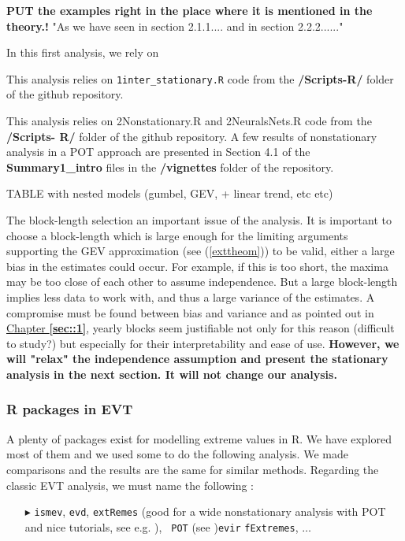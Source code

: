 \textbf{PUT the examples right in the place where it is mentioned in the theory.!} 
"As we have seen in section 2.1.1.... and in section 2.2.2......"

In this first analysis, we rely on 

This analysis relies on \texttt{1inter\_stationary.R} code from the \textbf{/Scripts-R/} folder of the github repository.

This analysis relies on 2Nonstationary.R and 2NeuralsNets.R code from the\textbf{ /Scripts-
R/} folder of the github repository. A few results of nonstationary analysis in a POT approach are
presented in Section 4.1 of the \textbf{Summary1\_intro} files in the \textbf{/vignettes} folder of the repository. 

TABLE with nested models (gumbel, GEV, + linear trend, etc etc)


The block-length selection an important issue of the analysis. It is important to choose a block-length which is large enough for the limiting arguments supporting the GEV approximation (see (\ref{exttheom})) to be valid, either a large bias in the estimates could occur. For example, if this is too short, the maxima may be too close of each other to assume independence. But a large block-length implies less data to work with, and thus a large variance of the estimates. A compromise must be found between bias and variance and as pointed out in \hyperref[sec::1]{Chapter \textbf{\ref{sec::1}}}, yearly blocks seem justifiable not only for this reason (difficult to study?) but especially for their interpretability and ease of use.
\textbf{However, we will "relax" the independence assumption and present the stationary analysis in the next section. It will not change our analysis.}

\subsubsection*{R packages in EVT}

A plenty of packages exist for modelling extreme values in R. We have explored most of them and we used some to do the following analysis. We made comparisons and the results are the same for similar methods. Regarding the classic EVT analysis, we must name the following : 
\vspace*{-.2cm}
\begin{itemize}
	\item[$\blacktriangleright$] \texttt{ismev}, \texttt{evd}, \texttt{extRemes} (good for a wide nonstationary analysis with POT and nice tutorials, see e.g. \citet{gilleland_extremes_2016}), \texttt{ POT} (see \citet{ribatet_users_2006})\texttt{evir} \texttt{fExtremes}, $\dots$
\end{itemize}

